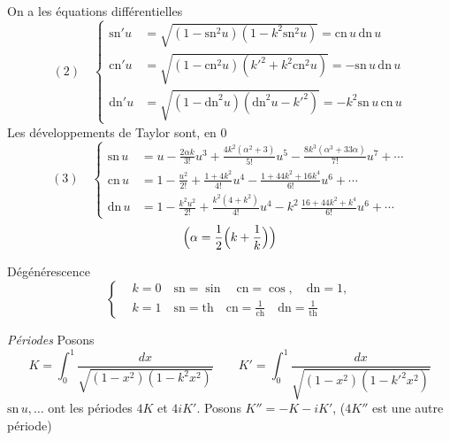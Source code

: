 \documentclass[11pt,a4paper]{article}
\begin{document}
On a les équations différentielles
\[
(2)\quad \left\lbrace
\begin{aligned}
\mathrm{sn}'u &= \sqrt{(1-\mathrm{sn}^2u)(1-k^2\mathrm{sn}^2u)} = \mathrm{cn}\,u\,\mathrm{dn}\,u\\
\mathrm{cn}'u &= \sqrt{(1-\mathrm{cn}^2u)(k'^2+k^2\mathrm{cn}^2u)} = -\mathrm{sn}\,u\,\mathrm{dn}\,u\\
\mathrm{dn}'u &= \sqrt{(1-\mathrm{dn}^2u)(\mathrm{dn}^2u-k'^2)} = -k^2\mathrm{sn}\,u\,\mathrm{cn}\,u
\end{aligned}
\right.
\]
Les développements de Taylor sont, en $0$
\[
(3)\quad \left\lbrace
\begin{aligned}
\mathrm{sn}\,u &= u - \frac{2\alpha k}{3!}u^3 + \frac{4k^2(\alpha^2+3)}{5!}u^5
- \frac{8k^3(\alpha^3+33\alpha)}{7!}u^7 + \cdots\\
\mathrm{cn}\,u &= 1 - \frac{u^2}{2!} + \frac{1+4k^2}{4!}u^4
- \frac{1+44k^2+16k^4}{6!}u^6 + \cdots\\
\mathrm{dn}\,u &= 1 - \frac{k^2u^2}{2!} + \frac{k^2(4+k^2)}{4!}u^4
- k^2\,\frac{16+44k^2+k^4}{6!}u^6 + \cdots
\end{aligned}
\right.
\]
\[
\Bigl(\alpha = \frac12\Bigl(k + \frac1k\Bigr)\Bigr)
\]

Dégénérescence
\[
\left\lbrace
\begin{aligned}
&k = 0 \quad \mathrm{sn} = \sin \quad \mathrm{cn} = \cos, \quad \mathrm{dn} = 1,\\
&k = 1 \quad \mathrm{sn} = \mathrm{th} \quad \mathrm{cn} = \frac{1}{\mathrm{ch}} \quad
\mathrm{dn} = \frac{1}{\mathrm{th}}
\end{aligned}
\right.
\]

\emph{Périodes} 
Posons
\[
K = \int_0^1\frac{dx}{\sqrt{(1-x^2)(1-k^2x^2)}} \qquad
K' = \int_0^1\frac{dx}{\sqrt{(1-x^2)(1-k'^2x^2)}}
\]
$\mathrm{sn}\,u, \ldots$ ont les périodes $4K$ et $4iK'$. Posons
$K'' = -K - iK'$, ($4K''$ est une autre période)
\end{document}

